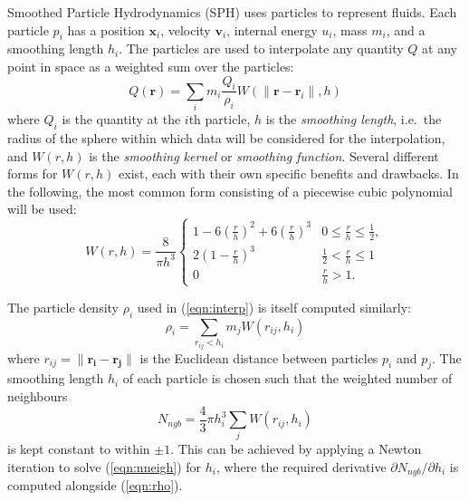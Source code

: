 \documentclass[final]{siamltex}
\newcommand{\eqn}[1]
    {(\ref{eqn:#1})}
\begin{document}
Smoothed Particle Hydrodynamics \cite{ref:Gingold1977,ref:Price2012}
 (SPH) uses particles to represent
fluids.
Each particle $p_i$ has a position $\mathbf x_i$,
velocity $\mathbf v_i$, internal energy $u_i$, mass $m_i$,
and a smoothing length $h_i$.
The particles are used to interpolate any quantity $Q$ at any 
point in space as a weighted sum over the particles:
%
\begin{equation}
    Q(\mathbf r) = \sum_i m_i \frac{Q_i}{\rho_i} W( \|\mathbf r - \mathbf r_i\| , h )
    \label{eqn:interp}
\end{equation}
%
where $Q_i$ is the quantity at the $i$th particle, $h$ is the
{\em smoothing length}, i.e.~the radius of the sphere within which data will
be considered for the interpolation, and
$W(r,h)$ is the {\em smoothing kernel} or {\em smoothing function}.
Several different forms for $W(r,h)$ exist, each with their own specific
benefits and drawbacks.
In the following, the most common form consisting of a piecewise
cubic polynomial will be used:
%
\begin{equation*}
    W(r,h) = \frac{8}{\pi h^3} \left\{
        \begin{array}{ll}
            1 - 6\left(\frac{r}{h}\right)^2 + 6\left(\frac{r}{h}\right)^3 & 0 \leq \frac{r}{h} \leq \frac{1}{2}, \\
            2\left( 1 - \frac{r}{h} \right)^3 & \frac{1}{2} < \frac{r}{h} \leq 1 \\
            0 & \frac{r}{h} > 1.
        \end{array}\right.
\end{equation*}

The particle density $\rho_i$ used in \eqn{interp} is itself
computed similarly:
%
\begin{equation}
    \rho_i = \sum_{r_{ij} < h_i} m_j W(r_{ij},h_i)
    \label{eqn:rho}
\end{equation}
%
where $r_{ij} = \|\mathbf{r_i}-\mathbf{r_j}\|$ is the Euclidean
distance between particles $p_i$ and $p_j$.
The smoothing length $h_i$ of each particle is chosen such that
the weighted number of neighbours
%
\begin{equation}
    N_{ngb} = \frac{4}{3}\pi h_i^3 \sum_j W( r_{ij} , h_i )
    \label{eqn:nneigh}
\end{equation}
%
is kept constant to within $\pm 1$.
This can be achieved by applying a Newton iteration to solve
\eqn{nneigh} for $h_i$, where the required derivative
$\partial N_{ngb}/\partial h_i$ is computed alongside \eqn{rho}.
\end{document}
